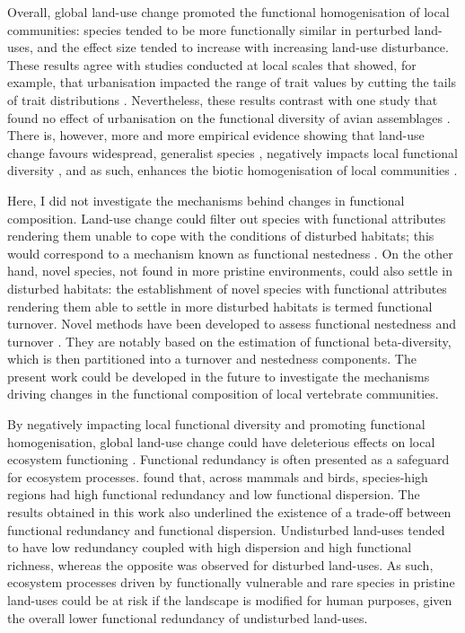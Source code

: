Overall, global land-use change promoted the functional homogenisation of local communities: species tended to be more functionally similar in perturbed land-uses, and the effect size tended to increase with increasing land-use disturbance. These results agree with studies conducted at local scales that showed, for example, that urbanisation impacted the range of trait values by cutting the tails of trait distributions \citep{LaSorte2018}. Nevertheless, these results contrast with one study that found no effect of urbanisation on the functional diversity of avian assemblages \citep{Hagen2017}. There is, however, more and more empirical evidence showing that land-use change favours widespread, generalist species \citep{Newbold2018a}, negatively impacts local functional diversity \citep{Chapman2018, Tinoco2018, Flynn2009, Huijbers2015}, and as such, enhances the biotic homogenisation of local communities \citep{Newbold2019_ets}.

Here, I did not investigate the mechanisms behind changes in functional composition. Land-use change could filter out species with functional attributes rendering them unable to cope with the conditions of disturbed habitats; this would correspond to a mechanism known as functional nestedness \citep{Balsega2015}. On the other hand, novel species, not found in more pristine environments, could also settle in disturbed habitats: the establishment of novel species with functional attributes rendering them able to settle in more disturbed habitats is termed functional turnover. Novel methods have been developed to assess functional nestedness and turnover \citep{Balsega2015}. They are notably based on the estimation of functional beta-diversity, which is then partitioned into a turnover and nestedness components. The present work could be developed in the future to investigate the mechanisms driving changes in the functional composition of local vertebrate communities.

By negatively impacting local functional diversity and promoting functional homogenisation, global land-use change could have deleterious effects on local ecosystem functioning \citep{Olden2004}. Functional redundancy is often presented as a safeguard for ecosystem processes. \citet{Cooke2019} found that, across mammals and birds, species-high regions had high functional redundancy and low functional dispersion. The results obtained in this work also underlined the existence of a trade-off between functional redundancy and functional dispersion. Undisturbed land-uses tended to have low redundancy coupled with high dispersion and high functional richness, whereas the opposite was observed for disturbed land-uses. As such, ecosystem processes driven by functionally vulnerable and rare species in pristine land-uses could be at risk if the landscape is modified for human purposes, given the overall lower functional redundancy of undisturbed land-uses.

